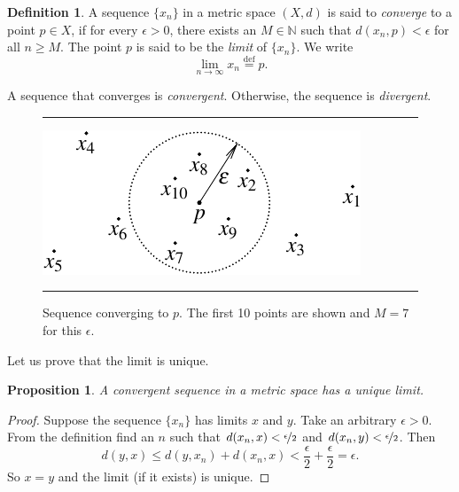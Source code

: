 \documentclass[12pt,openany]{book}
\newcommand{\N}{{\mathbb{N}}}
\theoremstyle{plain}
\newtheorem{prop}[thm]{Proposition}
\theoremstyle{remark}
\theoremstyle{definition}
\newtheorem{defn}[thm]{Definition}
\newenvironment{myfig}{%
\begin{figure}[h!t]
\noindent\rule{\textwidth}{0.4pt}\vspace{12pt}\par\centering}%
{\par\noindent\rule{\textwidth}{0.4pt}
\end{figure}}
\theoremstyle{exercise}
\theoremstyle{example}
\begin{document}
\begin{defn}
A sequence $\{ x_n \}$ in a metric space $(X,d)$ is said
to \emph{converge} to a point
$p \in X$, if for every $\epsilon > 0$, there exists an $M \in \N$ such
that $d(x_n,p) < \epsilon$ for all $n \geq M$.  The point $p$
is said to be the \emph{limit}
of $\{ x_n \}$.  We write
\begin{equation*}
\lim_{n\to \infty} x_n \overset{\text{def}}{=} p .
\end{equation*}

A sequence
that converges is \emph{convergent}.
Otherwise, the sequence is 
\emph{divergent}.
\begin{myfig}
\includegraphics{figures/sequence-convergence-metric}
\caption{Sequence converging to $p$.  The first 10 points 
are shown and $M=7$ for this $\epsilon$.\label{fig:sequence-convergence-metric}}
\end{myfig}
\end{defn}

Let us prove that the limit is unique.  

\begin{prop} \label{prop:mslimisunique}
A convergent sequence in a metric space has a unique limit.
\end{prop}

\begin{proof}
Suppose the sequence $\{ x_n \}$ has limits $x$ and $y$.
Take an arbitrary $\epsilon > 0$.
From the definition find an $n$ such that 
$d(x_n,x) < \nicefrac{\epsilon}{2}$ and
$d(x_n,y) < \nicefrac{\epsilon}{2}$.  Then
\begin{equation*}
d(y,x)
\leq
d(y,x_n) + d(x_n,x)
<
\frac{\epsilon}{2} + \frac{\epsilon}{2} = \epsilon .
\end{equation*}
So $x=y$ and the limit (if it exists) is unique.
\end{proof}
\end{document}
